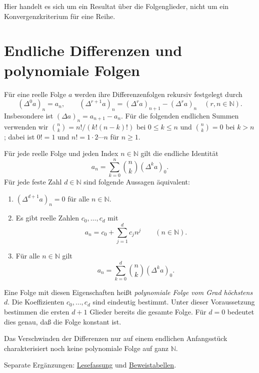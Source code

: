 Hier handelt es sich um ein Resultat über die Folgenglieder,
nicht um ein Konvergenzkriterium für eine Reihe.

\section{Endliche Differenzen und polynomiale Folgen}

\begin{definition}[Vorwärtsdifferenzen]
\label{b21guide:def:differences}
Für eine reelle Folge $a$ werden ihre Differenzenfolgen
rekursiv festgelegt durch
\[
 (\Delta^0a)_n=a_n,\qquad
 (\Delta^{r+1}a)_n=(\Delta^ra)_{n+1}-(\Delta^ra)_n
 \quad(r,n\in\mathbb N).
\]
Insbesondere ist $(\Delta a)_n=a_{n+1}-a_n$.
Für die folgenden endlichen Summen verwenden wir
$\binom nk=n!/(k!(n-k)!)$ bei $0\leq k\leq n$ und
$\binom nk=0$ bei $k>n$; dabei ist $0!=1$ und
$n!=1\cdot2\cdots n$ für $n\geq1$.
\end{definition}

\begin{theorem}
\label{b21guide:thm:newton}
Für jede reelle Folge und jeden Index $n\in\mathbb N$ gilt
die endliche Identität
\[
 a_n=\sum_{k=0}^{n}\binom nk(\Delta^ka)_0.
\]
Für jede feste Zahl $d\in\mathbb N$ sind folgende Aussagen
äquivalent:
\begin{enumerate}
 \item $(\Delta^{d+1}a)_n=0$ für alle $n\in\mathbb N$.
 \item Es gibt reelle Zahlen $c_0,\ldots,c_d$ mit
 \[
  a_n=c_0+\sum_{j=1}^{d}c_jn^j
  \qquad(n\in\mathbb N).
 \]
 \item Für alle $n\in\mathbb N$ gilt
 \[
  a_n=\sum_{k=0}^{d}\binom nk(\Delta^ka)_0.
 \]
\end{enumerate}
Eine Folge mit diesen Eigenschaften heißt \emph{polynomiale
Folge vom Grad höchstens $d$}. Die Koeffizienten
$c_0,\ldots,c_d$ sind eindeutig bestimmt.
Unter dieser Voraussetzung bestimmen die ersten $d+1$ Glieder
bereits die gesamte Folge.
Für $d=0$ bedeutet dies genau, daß die Folge konstant ist.

Das Verschwinden der Differenzen nur auf einem endlichen
Anfangsstück charakterisiert noch keine polynomiale Folge
auf ganz $\mathbb N$.
\end{theorem}

Separate Ergänzungen:
\href{../newton/_B21-newton-reading.pdf\#newton.reading}{Lesefassung}
und \href{../newton/_B21-newton-proofs.pdf\#newton.proofs}{Beweistabellen}.

